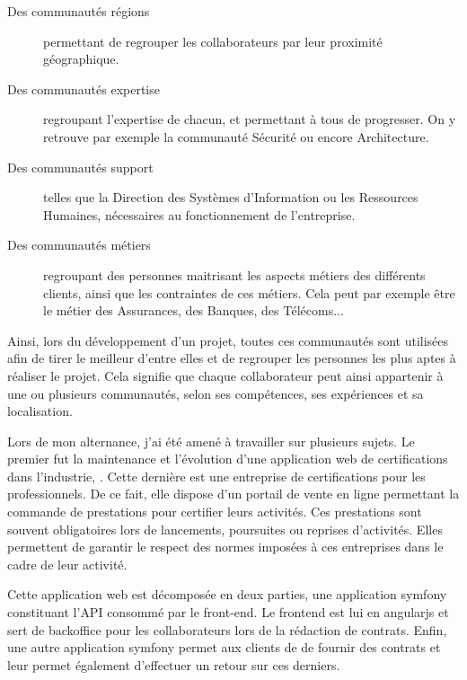 \begin{description}
	\item [Des communautés régions] permettant de regrouper les collaborateurs par leur proximité géographique.
	\item [Des communautés expertise] regroupant l'expertise de chacun, et permettant à tous de progresser. On y retrouve par exemple la communauté Sécurité ou encore Architecture.
	\item [Des communautés support] telles que la Direction des Systèmes d'Information ou les Ressources Humaines, nécessaires au fonctionnement de l'entreprise.
	\item [Des communautés métiers] regroupant des personnes maitrisant les aspects métiers des différents clients, ainsi que les contraintes de ces métiers. Cela peut par exemple être le métier des Assurances, des Banques, des Télécoms... 
\end{description}

Ainsi, lors du développement d'un projet, toutes ces communautés sont utilisées afin de tirer le meilleur d'entre elles et de regrouper les personnes les plus aptes à réaliser le projet. Cela signifie que chaque collaborateur peut ainsi appartenir à une ou plusieurs communautés, selon ses compétences, ses expériences et sa localisation. 

Lors de mon alternance, j'ai été amené à travailler sur plusieurs sujets. Le premier fut la maintenance et l'évolution d'une application web de certifications dans l'industrie, \bv. Cette dernière est une entreprise de certifications pour les professionnels. De ce fait, elle dispose d’un portail de vente en ligne permettant la commande de prestations pour certifier leurs activités. Ces prestations sont souvent obligatoires lors de lancements, poursuites ou reprises d'activités. Elles permettent de garantir le respect des normes imposées à ces entreprises dans le cadre de leur activité. 

\clearpage

Cette application web est décomposée en deux parties, une application \gls{symfony} constituant l'\gls{API} consommé par le front-end. Le \gls{frontend} est lui en \gls{angularjs} et sert de \gls{backoffice} pour les collaborateurs \bv{} lors de la rédaction de contrats. Enfin, une autre application \gls{symfony} permet aux clients de \bv{} de fournir des contrats et leur permet également d'effectuer un retour sur ces derniers.

